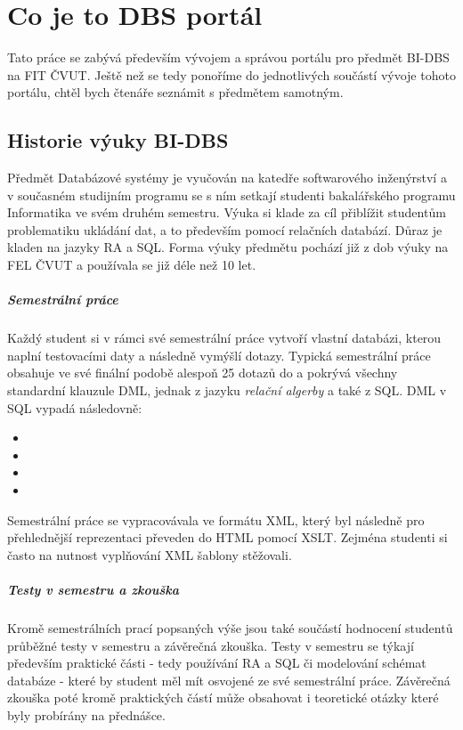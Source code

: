 \chapter{Co je to DBS portál} \label{DBSportal}

Tato práce se zabývá především vývojem a správou portálu pro předmět BI-DBS na FIT ČVUT. Ještě než se tedy ponoříme do jednotlivých součástí vývoje tohoto portálu, chtěl bych čtenáře seznámit s předmětem samotným.

\section{Historie výuky BI-DBS}

Předmět Databázové systémy je vyučován na katedře softwarového inženýrství a v současném studijním programu se s ním setkají studenti bakalářského programu Informatika ve svém druhém semestru. Výuka si klade za cíl přiblížit studentům problematiku ukládání dat, a to především pomocí relačních databází. Důraz je kladen na jazyky RA a SQL. Forma výuky předmětu pochází již z dob výuky na FEL ČVUT a používala se již déle než 10 let.

\paragraph{Semestrální práce}
Každý student si v rámci své semestrální práce vytvoří vlastní databázi, kterou naplní testovacími daty a následně vymýšlí dotazy. Typická semestrální práce obsahuje ve své finální podobě alespoň 25 dotazů do a pokrývá všechny standardní klauzule DML, jednak z jazyku \emph{relační algerby} a také z SQL. DML v SQL vypadá následovně:
\begin{itemize}
	\item {}
	\item {}
	\item {}
	\item {}
\end{itemize}
Semestrální práce se vypracovávala ve formátu XML, který byl následně pro přehlednější reprezentaci převeden do HTML pomocí XSLT. Zejména studenti si často na nutnost vyplňování XML šablony stěžovali.

\paragraph{Testy v semestru a zkouška}
Kromě semestrálních prací popsaných výše jsou také součástí hodnocení studentů průběžné testy v semestru a závěrečná zkouška. Testy v semestru se týkají především praktické části - tedy používání RA a SQL či modelování schémat databáze - které by student měl mít osvojené ze své semestrální práce. Závěrečná zkouška poté kromě praktických částí může obsahovat i teoretické otázky které byly probírány na přednášce.

